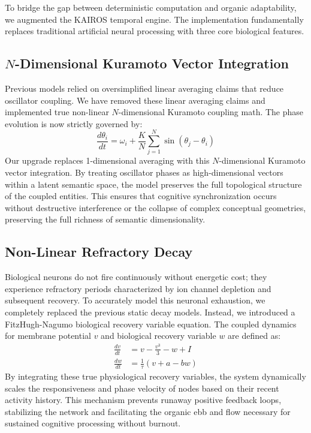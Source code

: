 \documentclass[11pt,a4paper]{article}
\begin{document}
To bridge the gap between deterministic computation and organic adaptability, we augmented the KAIROS temporal engine. The implementation fundamentally replaces traditional artificial neural processing with three core biological features.

\subsection{$N$-Dimensional Kuramoto Vector Integration}

Previous models relied on oversimplified linear averaging claims that reduce oscillator coupling. We have removed these linear averaging claims and implemented true non-linear $N$-dimensional Kuramoto coupling math. The phase evolution is now strictly governed by:
\begin{equation}
\frac{d\theta_i}{dt} = \omega_i + \frac{K}{N} \sum_{j=1}^{N} \sin(\theta_j - \theta_i)
\end{equation}
Our upgrade replaces 1-dimensional averaging with this $N$-dimensional Kuramoto vector integration. By treating oscillator phases as high-dimensional vectors within a latent semantic space, the model preserves the full topological structure of the coupled entities. This ensures that cognitive synchronization occurs without destructive interference or the collapse of complex conceptual geometries, preserving the full richness of semantic dimensionality.

\subsection{Non-Linear Refractory Decay}

Biological neurons do not fire continuously without energetic cost; they experience refractory periods characterized by ion channel depletion and subsequent recovery. To accurately model this neuronal exhaustion, we completely replaced the previous static decay models. Instead, we introduced a FitzHugh-Nagumo biological recovery variable equation. The coupled dynamics for membrane potential $v$ and biological recovery variable $w$ are defined as:
\begin{align}
\frac{dv}{dt} &= v - \frac{v^3}{3} - w + I \\
\frac{dw}{dt} &= \frac{1}{\tau} (v + a - bw)
\end{align}
By integrating these true physiological recovery variables, the system dynamically scales the responsiveness and phase velocity of nodes based on their recent activity history. This mechanism prevents runaway positive feedback loops, stabilizing the network and facilitating the organic ebb and flow necessary for sustained cognitive processing without burnout.
\end{document}
